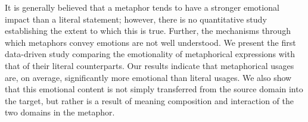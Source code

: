 It is generally believed that a metaphor tends to have a stronger emotional impact than a literal statement; however, there is no quantitative study establishing the extent to which this is true. Further, the mechanisms through which metaphors convey emotions are not well understood. We present the first data-driven study comparing the emotionality of metaphorical expressions with that of their literal counterparts. Our results indicate that metaphorical usages are, on average, significantly more emotional than literal usages. We also show that this emotional content is not simply transferred from the source domain into the target, but rather is a result of meaning composition and interaction of the two domains in the metaphor.
